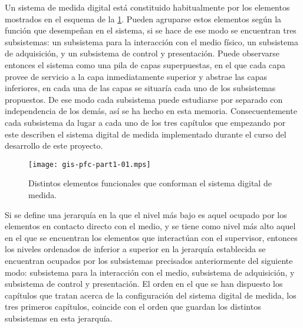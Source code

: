 Un sistema de medida digital está constituido habitualmente por los
elementos mostrados en el esquema de la \cref{fig:digmeasstm}. Pueden
agruparse estos elementos según la función que desempeñan en el sistema, si
se hace de ese modo se encuentran tres subsistemas: un subsistema para la
interacción con el medio físico, un subsistema de adquisición, y un
subsistema de control y presentación. Puede observarse entonces el sistema
como una pila de capas superpuestas, en el que cada capa provee de servicio
a la capa inmediatamente superior y abstrae las capas inferiores, en cada
una de las capas se situaría cada uno de los subsistemas propuestos. De ese
modo cada subsistema puede estudiarse por separado con independencia de los
demás, así se ha hecho en esta memoria. Consecuentemente cada subsistema da
lugar a cada uno de los tres capítulos que empezando por este describen el
sistema digital de medida implementado durante el curso del desarrollo de
este proyecto.

\begin{figure}
	\begin{center}
		\texttt{[image: gis-pfc-part1-01.mps]}
	\end{center}
	\caption[Sistema digital de medida] {Distintos elementos
	funcionales que conforman el sistema digital de medida.}
	\label{fig:digmeasstm}
\end{figure}

Si se define una jerarquía en la que el nivel más bajo es aquel ocupado por
los elementos en contacto directo con el medio, y se tiene como nivel más
alto aquel en el que se encuentran los elementos que interactúan con el
supervisor, entonces los niveles ordenados de inferior a superior en la
jerarquía establecida se encuentran ocupados por los subsistemas precisados
anteriormente del siguiente modo: subsistema para la interacción con el
medio, subsistema de adquisición, y subsistema de control y presentación.
El orden en el que se han dispuesto los capítulos que tratan acerca de la
configuración del sistema digital de medida, los tres primeros capítulos,
coincide con el orden que guardan los distintos subsistemas en esta
jerarquía.
